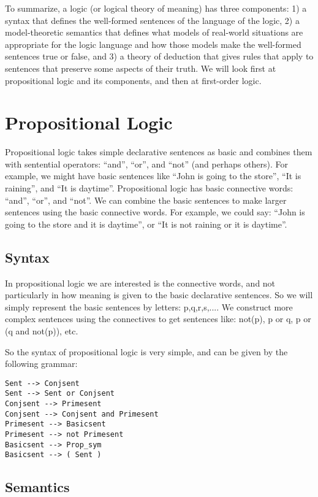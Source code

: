 To summarize, a logic (or logical theory of meaning) has three
components: 1) a syntax that defines the well-formed sentences of the
language of the logic, 2) a model-theoretic semantics that defines
what models of real-world situations are appropriate for the logic
language and how those models make the well-formed sentences true or
false, and 3) a theory of deduction that gives rules that apply to
sentences that preserve some aspects of their truth.  We will look
first at propositional logic and its components, and then at
first-order logic.

\section{Propositional Logic}

Propositional logic takes simple declarative sentences as basic and
combines them with sentential operators: ``and'', ``or'', and ``not''
(and perhaps others).  For example, we might have basic sentences like
``John is going to the store'', ``It is raining'', and ``It is
daytime''.  Propositional logic has basic connective words: ``and'',
``or'', and ``not''.  We can combine the basic sentences to make
larger sentences using the basic connective words.  For example, we
could say: ``John is going to the store and it is daytime'', or ``It
is not raining or it is daytime''.

\subsection{Syntax}

In propositional logic we are interested is the connective
words, and not particularly in how meaning is given to the basic
declarative sentences.  So we will simply represent the basic
sentences by letters: p,q,r,s,....  We construct more complex
sentences using the connectives to get sentences like: not(p), p or q,
p or (q and not(p)), etc.

So the syntax of propositional logic is very simple, and can be given
by the following grammar:

\begin{verbatim}
Sent --> Conjsent
Sent --> Sent or Conjsent
Conjsent --> Primesent
Conjsent --> Conjsent and Primesent
Primesent --> Basicsent
Primesent --> not Primesent
Basicsent --> Prop_sym
Basicsent --> ( Sent )
\end{verbatim}

\subsection{Semantics}

